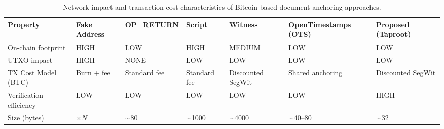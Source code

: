 \begin{table}[!t]
\caption{Network impact and transaction cost characteristics of Bitcoin-based document anchoring approaches.}
\label{tab:comparative_cost}
\centering
\small
\setlength{\tabcolsep}{3pt}
\renewcommand{\arraystretch}{1.5}
\begin{tabularx}{\textwidth}{>{\RaggedRight\arraybackslash}p{3.5cm}
>{\RaggedRight\arraybackslash}X
>{\RaggedRight\arraybackslash}p{2.2cm}
>{\RaggedRight\arraybackslash}X
>{\RaggedRight\arraybackslash}X
>{\RaggedRight\arraybackslash}p{3cm}
>{\RaggedRight\arraybackslash}X}
\toprule
\textbf{Property} &
\textbf{Fake Address} &
\textbf{OP\_RETURN} &
\textbf{Script} &
\textbf{Witness} &
\textbf{OpenTimestamps (OTS)} &
\textbf{Proposed (Taproot)} \\
\midrule

On-chain footprint &
HIGH &
LOW &
HIGH &
MEDIUM &
LOW &
LOW \\

UTXO impact &
HIGH &
NONE &
LOW &
LOW &
LOW &
LOW \\

TX Cost Model (BTC) &
Burn + fee &
Standard fee &
Standard fee &
Discounted SegWit &
Shared anchoring &
Discounted SegWit \\

Verification efficiency &
LOW &
LOW &
LOW &
LOW &
LOW &
HIGH \\

Size (bytes) &
20$\times N$ &
$\sim$80 &
$\sim$1000 &
$\sim$4000 &
$\sim$40--80 &
$\sim$32 \\
\bottomrule
\end{tabularx}
\end{table}